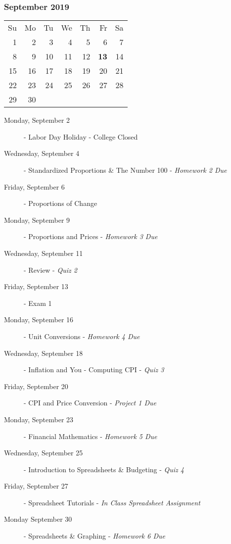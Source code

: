 \subsubsection*{September 2019}
\begin{tabular}{rrrrrrr}
Su & Mo & Tu & We & Th & Fr & Sa\\
 1 &  2 &  3 &  4 &  5 &  6 & 7\\
 8 &  9 & 10 & 11 & 12 & {\bf 13} & 14\\
15 & 16 & 17 & 18 & 19 & 20 & 21\\
22 & 23 & 24 & 25 & 26 & 27 & 28\\
29 & 30 &    &    &    &    &   \\
\end{tabular}
\begin{description}
\item[Monday, September 2] - Labor Day Holiday - College Closed
\item[Wednesday, September 4]
  - Standardized Proportions \& The Number 100 - {\em Homework 2 Due}
\item[Friday, September 6]
  - Proportions of Change

\item[Monday, September 9]
  - Proportions and Prices - {\em Homework 3 Due}
\item[Wednesday, September 11]
  - Review - {\em Quiz 2}
\item[Friday, September 13]
  - Exam 1

\item[Monday, September 16]
  - Unit Conversions - {\em Homework 4 Due}
\item[Wednesday, September 18]
  - Inflation and You - Computing CPI - {\em Quiz 3}
\item[Friday, September 20]
  - CPI and Price Conversion - {\em Project 1 Due}

\item[Monday, September 23] 
  - Financial Mathematics - {\em Homework 5 Due}
\item[Wednesday, September 25]
  - Introduction to Spreadsheets \& Budgeting - {\em Quiz 4}
\item[Friday, September 27]
  - Spreadsheet Tutorials - {\em In Class Spreadsheet Assignment}

\item[Monday September 30]
  - Spreadsheets \& Graphing - {\em Homework 6 Due}
\end{description}
\hrulefill

